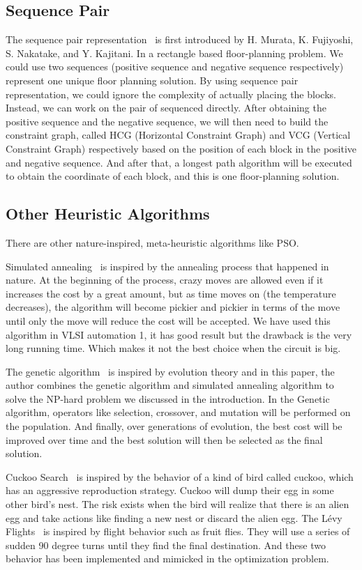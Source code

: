 \documentclass{article}
\begin{document}
\subsection{Sequence Pair}
\label{sec:orga976d89}
The sequence pair representation~\cite{SeqPair} is first introduced by H. Murata, K. Fujiyoshi, S. Nakatake, and Y. Kajitani. In a rectangle based floor-planning problem. We could use two sequences (positive sequence and negative sequence respectively) represent one unique floor planning solution. By using sequence pair representation, we could ignore the complexity of actually placing the blocks. Instead, we can work on the pair of sequenced directly. After obtaining the positive sequence and the negative sequence, we will then need to build the constraint graph, called HCG (Horizontal Constraint Graph) and VCG (Vertical Constraint Graph) respectively based on the position of each block in the positive and negative sequence. And after that, a longest path algorithm will be executed to obtain the coordinate of each block, and this is one floor-planning solution.
\subsection{Other Heuristic Algorithms}
\label{sec:org045b8dd}
There are other nature-inspired, meta-heuristic algorithms like PSO.

Simulated annealing~\cite{5571036} is inspired by the annealing process that happened in nature. At the beginning of the process, crazy moves are allowed even if it increases the cost by a great amount, but as time moves on (the temperature decreases), the algorithm will become pickier and pickier in terms of the move until only the move will reduce the cost will be accepted. We have used this algorithm in VLSI automation 1, it has good result but the drawback is the very long running time. Which makes it not the best choice when the circuit is big.

The genetic algorithm~\cite{Shanavas_Gnanamurthy_2014} is inspired by evolution theory and in this paper, the author combines the genetic algorithm and simulated annealing algorithm to solve the NP-hard problem we discussed in the introduction. In the Genetic algorithm, operators like selection, crossover, and mutation will be performed on the population. And finally, over generations of evolution, the best cost will be improved over time and the best solution will then be selected as the final solution.

Cuckoo Search~\cite{5393690} is inspired by the behavior of a kind of bird called cuckoo, which has an aggressive reproduction strategy. Cuckoo will dump their egg in some other bird's nest. The risk exists when the bird will realize that there is an alien egg and take actions like finding a new nest or discard the alien egg. The Lévy Flights~\cite{5393690} is inspired by flight behavior such as fruit flies. They will use a series of sudden 90 degree turns until they find the final destination. And these two behavior has been implemented and mimicked in the optimization problem.
\end{document}
